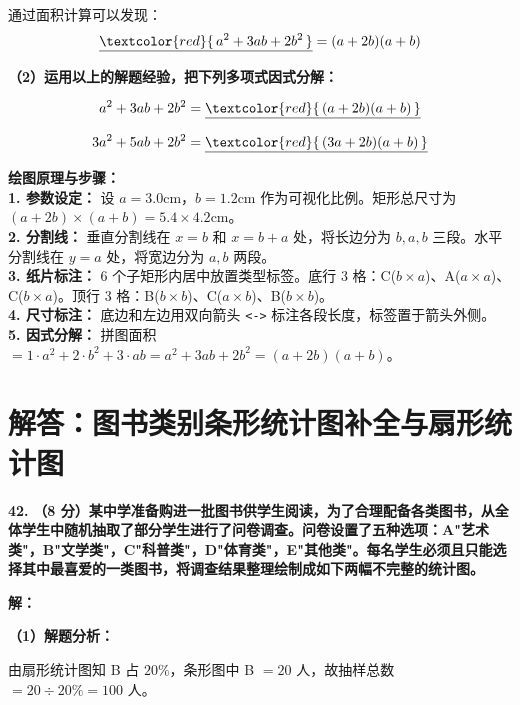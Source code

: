 \documentclass[12pt, a4paper]{ctexrep}
\begin{document}
通过面积计算可以发现：
$$\underline{\textcolor{red}{\,a^2 + 3ab + 2b^2\,}} = (a+2b)(a+b)$$

\vspace{0.3cm}
\textbf{（2）运用以上的解题经验，把下列多项式因式分解：}

$$a^2 + 3ab + 2b^2 = \underline{\textcolor{red}{\,(a+2b)(a+b)\,}}$$

$$3a^2 + 5ab + 2b^2 = \underline{\textcolor{red}{\,(3a+2b)(a+b)\,}}$$

\vspace{0.4cm}
{\small\color{blue!70!black}
\textbf{绘图原理与步骤：}\\
\textbf{1. 参数设定：} 设 $a = 3.0$cm，$b = 1.2$cm 作为可视化比例。矩形总尺寸为 $(a+2b) \times (a+b) = 5.4 \times 4.2$cm。\\
\textbf{2. 分割线：} 垂直分割线在 $x = b$ 和 $x = b + a$ 处，将长边分为 $b, a, b$ 三段。水平分割线在 $y = a$ 处，将宽边分为 $a, b$ 两段。\\
\textbf{3. 纸片标注：} 6 个子矩形内居中放置类型标签。底行 3 格：C($b \times a$)、A($a \times a$)、C($b \times a$)。顶行 3 格：B($b \times b$)、C($a \times b$)、B($b \times b$)。\\
\textbf{4. 尺寸标注：} 底边和左边用双向箭头 \texttt{<->} 标注各段长度，标签置于箭头外侧。\\
\textbf{5. 因式分解：} 拼图面积 $= 1 \cdot a^2 + 2 \cdot b^2 + 3 \cdot ab = a^2 + 3ab + 2b^2 = (a+2b)(a+b)$。
}

\newpage

\section{解答：图书类别条形统计图补全与扇形统计图}

\vspace{0.6cm}

\textbf{\LARGE 42.} \textbf{（8 分）某中学准备购进一批图书供学生阅读，为了合理配备各类图书，从全体学生中随机抽取了部分学生进行了问卷调查。问卷设置了五种选项：A"艺术类"，B"文学类"，C"科普类"，D"体育类"，E"其他类"。每名学生必须且只能选择其中最喜爱的一类图书，将调查结果整理绘制成如下两幅不完整的统计图。}

\vspace{0.4cm}
\textbf{解：}

\textbf{（1）解题分析：}

由扇形统计图知 B 占 $20\%$，条形图中 B $= 20$ 人，故抽样总数 $= 20 \div 20\% = 100$ 人。
\end{document}
